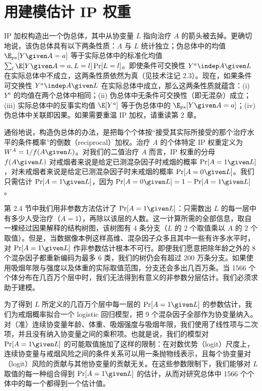 \section{用建模估计 IP 权重}

IP 加权构造出一个伪总体，其中从协变量 $L$ 指向治疗 $A$ 的箭头被去掉。更确切地说，该伪总体具有以下两条性质：$A$ 与 $L$ 统计独立；伪总体中的均值 $\E_{ps}[Y\given A=a]$ 等于实际总体中的标准化均值 $\sum_l \E[Y\given A=a,L=l]\Pr[L=l]$。即使条件可交换性 $Y^{a}\indep A\given L$ 在实际总体中不成立，这两条性质依然为真（见技术注记 2.3）。现在，如果条件可交换性 $Y^{a}\indep A\given L$ 在实际总体中成立，那么这两条性质就蕴含：(i) $Y^{a}$ 的均值在两个总体中相同；(ii) 伪总体中无条件可交换性（即无混杂）成立；(iii) 实际总体中的反事实均值 $\E[Y^{a}]$ 等于伪总体中的 $\E_{ps}[Y\given A=a]$；(iv) 伪总体中关联即因果。如果需要重温 IP 加权，请重读第 2 章。

通俗地说，构造伪总体的办法，是把每个个体按“接受其实际所接受的那个治疗水平的条件概率”的倒数（reciprocal）加权。治疗 $A$ 的个体特定 IP 权重定义为 $W^{A}=1/f(A\given L)$。对我们的二值治疗 $A$ 而言，IP 权重的分母 $f(A\given L)$ 对戒烟者来说是给定已测混杂因子时戒烟的概率 $\Pr[A=1\given L]$，对未戒烟者来说是给定已测混杂因子时未戒烟的概率 $\Pr[A=0\given L]$。我们只需估计 $\Pr[A=1\given L]$，因为 $\Pr[A=0\given L]=1-\Pr[A=1\given L]$。

第 2.4 节中我们用非参数方法估计了 $\Pr[A=1\given L]$：只需数出 $L$ 的每一层中有多少人受治疗（$A=1$），再除以该层的人数。这一计算所需的全部信息，取自一棵经过因果解释的结构树图，该树图有 4 条分支（$L$ 的 2 个取值乘以 $A$ 的 2 个取值）。但是，当数据像本例这样高维、混杂因子众多且其中一些有许多水平时，对 $\Pr[A=1\given L]$ 作非参数估计根本不可行。即便我们愿意把除年龄之外的 8 个混杂因子都重新编码为最多 6 类，我们的树仍会有超过 200 万条分支。如果使用吸烟年限与强度以及体重的实际取值范围，分支还会多出几百万条。当 1566 个个体分布在几百万个层中时，我们无法得到有意义的非参数分层估计。我们必须求助于建模。

为了得到 $L$ 所定义的几百万个层中每一层的 $\Pr[A=1\given L]$ 的参数估计，我们为戒烟概率拟合一个 logistic 回归模型，把 9 个混杂因子全部作为协变量纳入。对（准）连续协变量年龄、体重、吸烟强度与吸烟年限，我们使用了线性项与二次项，并且没有纳入协变量之间的乘积项。也就是说，我们的模型对 $\Pr[A=1\given L]$ 的可能取值施加了这样的限制：在对数优势（logit）尺度上，连续协变量与戒烟风险之间的条件关系可以用一条抛物线表示，且每个协变量对（logit）风险的贡献与其他协变量的贡献无关。在这些参数限制下，我们能够对 $L$ 取值的每一种组合得到 $\Pr[A=1\given L]$ 的估计，从而对研究总体中 1566 个个体中的每一个都得到一个估计值。

